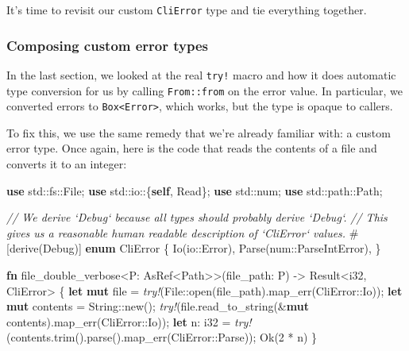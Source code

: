 \documentclass[a4paper,]{book}
\renewcommand*{\hypertarget}[3][\ar]{%
  \def\ar{#2}%
  \label{#1}%
  #3}
\newenvironment{Shaded}{\begin{snugshade}}{\end{snugshade}}
\newcommand{\KeywordTok}[1]{\textcolor[rgb]{0.13,0.29,0.53}{\textbf{{#1}}}}
\newcommand{\DataTypeTok}[1]{\textcolor[rgb]{0.13,0.29,0.53}{{#1}}}
\newcommand{\DecValTok}[1]{\textcolor[rgb]{0.00,0.00,0.81}{{#1}}}
\newcommand{\ConstantTok}[1]{\textcolor[rgb]{0.00,0.00,0.00}{{#1}}}
\newcommand{\CommentTok}[1]{\textcolor[rgb]{0.56,0.35,0.01}{\textit{{#1}}}}
\newcommand{\BuiltInTok}[1]{{#1}}
\newcommand{\PreprocessorTok}[1]{\textcolor[rgb]{0.56,0.35,0.01}{\textit{{#1}}}}
\newcommand{\AttributeTok}[1]{\textcolor[rgb]{0.77,0.63,0.00}{{#1}}}
\newcommand{\NormalTok}[1]{{#1}}
\begin{document}
It's time to revisit our custom \texttt{CliError} type and tie
everything together.

\hypertarget{composing-custom-error-types}{\subsubsection{Composing
custom error types}\label{composing-custom-error-types}}

In the last section, we looked at the real \texttt{try!} macro and how
it does automatic type conversion for us by calling \texttt{From::from}
on the error value. In particular, we converted errors to
\texttt{Box\textless{}Error\textgreater{}}, which works, but the type is
opaque to callers.

To fix this, we use the same remedy that we're already familiar with: a
custom error type. Once again, here is the code that reads the contents
of a file and converts it to an integer:

\begin{Shaded}
\begin{Highlighting}[]
\KeywordTok{use} \NormalTok{std::fs::File;}
\KeywordTok{use} \NormalTok{std::io::\{}\KeywordTok{self}\NormalTok{, Read\};}
\KeywordTok{use} \NormalTok{std::num;}
\KeywordTok{use} \NormalTok{std::path::Path;}

\CommentTok{// We derive `Debug` because all types should probably derive `Debug`.}
\CommentTok{// This gives us a reasonable human readable description of `CliError` values.}
\AttributeTok{#[}\NormalTok{derive}\AttributeTok{(}\BuiltInTok{Debug}\AttributeTok{)]}
\KeywordTok{enum} \NormalTok{CliError \{}
    \NormalTok{Io(io::Error),}
    \NormalTok{Parse(num::ParseIntError),}
\NormalTok{\}}

\KeywordTok{fn} \NormalTok{file_double_verbose<P: AsRef<Path>>(file_path: P) -> }\DataTypeTok{Result}\NormalTok{<}\DataTypeTok{i32}\NormalTok{, CliError> \{}
    \KeywordTok{let} \KeywordTok{mut} \NormalTok{file = }\PreprocessorTok{try!}\NormalTok{(File::open(file_path).map_err(CliError::Io));}
    \KeywordTok{let} \KeywordTok{mut} \NormalTok{contents = }\DataTypeTok{String}\NormalTok{::new();}
    \PreprocessorTok{try!}\NormalTok{(file.read_to_string(&}\KeywordTok{mut} \NormalTok{contents).map_err(CliError::Io));}
    \KeywordTok{let} \NormalTok{n: }\DataTypeTok{i32} \NormalTok{= }\PreprocessorTok{try!}\NormalTok{(contents.trim().parse().map_err(CliError::Parse));}
    \ConstantTok{Ok}\NormalTok{(}\DecValTok{2} \NormalTok{* n)}
\NormalTok{\}}
\end{Highlighting}
\end{Shaded}
\end{document}

